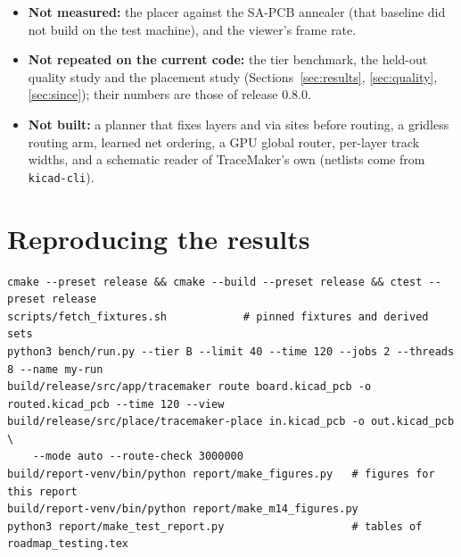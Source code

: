 \documentclass[10pt,a4paper]{article}
\begin{document}
\begin{itemize}[leftmargin=*]
  \item \textbf{Not measured:} the placer against the SA-PCB annealer (that baseline did not build on the test
  machine), and the viewer's frame rate.
  \item \textbf{Not repeated on the current code:} the tier benchmark, the held-out quality study and the placement
  study (Sections~\ref{sec:results}, \ref{sec:quality}, \ref{sec:since}); their numbers are those of release 0.8.0.
  \item \textbf{Not built:} a planner that fixes layers and via sites before routing, a gridless routing arm, learned net ordering, a GPU global router, per-layer track
  widths, and a schematic reader of TraceMaker's own (netlists come from \texttt{kicad-cli}).
\end{itemize}

\appendix
\section{Reproducing the results}
\begin{small}
\begin{verbatim}
cmake --preset release && cmake --build --preset release && ctest --preset release
scripts/fetch_fixtures.sh            # pinned fixtures and derived sets
python3 bench/run.py --tier B --limit 40 --time 120 --jobs 2 --threads 8 --name my-run
build/release/src/app/tracemaker route board.kicad_pcb -o routed.kicad_pcb --time 120 --view
build/release/src/place/tracemaker-place in.kicad_pcb -o out.kicad_pcb \
    --mode auto --route-check 3000000
build/report-venv/bin/python report/make_figures.py   # figures for this report
build/report-venv/bin/python report/make_m14_figures.py
python3 report/make_test_report.py                    # tables of roadmap_testing.tex
\end{verbatim}
\end{small}
\end{document}
